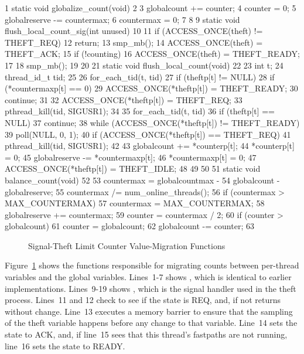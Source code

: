 { \scriptsize
\begin{verbbox}
  1 static void globalize_count(void)
  2 {
  3   globalcount += counter;
  4   counter = 0;
  5   globalreserve -= countermax;
  6   countermax = 0;
  7 }
  8 
  9 static void flush_local_count_sig(int unused)
 10 {
 11   if (ACCESS_ONCE(theft) != THEFT_REQ)
 12     return;
 13   smp_mb();
 14   ACCESS_ONCE(theft) = THEFT_ACK;
 15   if (!counting) {
 16     ACCESS_ONCE(theft) = THEFT_READY;
 17   }
 18   smp_mb();
 19 }
 20 
 21 static void flush_local_count(void)
 22 {
 23   int t;
 24   thread_id_t tid;
 25 
 26   for_each_tid(t, tid)
 27     if (theftp[t] != NULL) {
 28       if (*countermaxp[t] == 0) {
 29         ACCESS_ONCE(*theftp[t]) = THEFT_READY;
 30         continue;
 31       }
 32       ACCESS_ONCE(*theftp[t]) = THEFT_REQ;
 33       pthread_kill(tid, SIGUSR1);
 34     }
 35   for_each_tid(t, tid) {
 36     if (theftp[t] == NULL)
 37       continue;
 38     while (ACCESS_ONCE(*theftp[t]) != THEFT_READY) {
 39       poll(NULL, 0, 1);
 40       if (ACCESS_ONCE(*theftp[t]) == THEFT_REQ)
 41         pthread_kill(tid, SIGUSR1);
 42     }
 43     globalcount += *counterp[t];
 44     *counterp[t] = 0;
 45     globalreserve -= *countermaxp[t];
 46     *countermaxp[t] = 0;
 47     ACCESS_ONCE(*theftp[t]) = THEFT_IDLE;
 48   }
 49 }
 50 
 51 static void balance_count(void)
 52 {
 53   countermax = globalcountmax -
 54     globalcount - globalreserve;
 55   countermax /= num_online_threads();
 56   if (countermax > MAX_COUNTERMAX)
 57     countermax = MAX_COUNTERMAX;
 58   globalreserve += countermax;
 59   counter = countermax / 2;
 60   if (counter > globalcount)
 61     counter = globalcount;
 62   globalcount -= counter;
 63 }
\end{verbbox}
}
\begin{figure}[tbp]
\centering
\theverbbox
\caption{Signal-Theft Limit Counter Value-Migration Functions}
\label{fig:count:Signal-Theft Limit Counter Value-Migration Functions}
\end{figure}

Figure~\ref{fig:count:Signal-Theft Limit Counter Value-Migration Functions}
shows the functions responsible for migrating counts between per-thread
variables and the global variables.
Lines~1-7 shows , which is identical to earlier
implementations.
Lines~9-19 shows , which is the signal
handler used in the theft process.
Lines~11 and 12 check to see if the  state is REQ, and, if not
returns without change.
Line~13 executes a memory barrier to ensure that the sampling of the
theft variable happens before any change to that variable.
Line~14 sets the  state to ACK, and, if line~15 sees that
this thread's fastpaths are not running, line~16 sets the 
state to READY.

